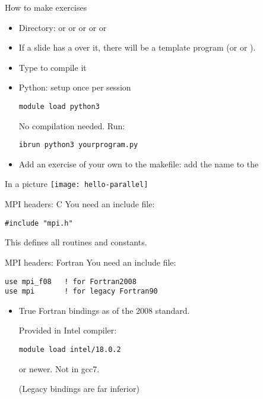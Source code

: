 \begin{numberedframe}{How to make exercises}
  \begin{itemize}
  \item Directory:  or  or  or 
    or  or 
  \item If a slide has a  over it, there will be a
    template program  (or  or ).
  \item Type  to compile it
  \item Python: setup once per session
\begin{verbatim}
module load python3
\end{verbatim}
No compilation needed. Run:
\begin{verbatim}
ibrun python3 yourprogram.py
\end{verbatim}
\item Add an exercise of your own to the makefile: add the name to
    the 
  \end{itemize}
\end{numberedframe}

\begin{exerciseframe}[hello]
  
\end{exerciseframe}

\begin{numberedframe}{In a picture}
  \texttt{[image: hello-parallel]}
\end{numberedframe}


\begin{numberedframe}{MPI headers: C}
\label{sl:mpi-header-c}
You need an include file:
\begin{verbatim}
#include "mpi.h"
\end{verbatim}
This defines all routines and constants.
\end{numberedframe}

\begin{fortran}
\begin{numberedframe}{MPI headers: Fortran}
\label{sl:mpi-header-f}
You need an include file:
\begin{verbatim}
use mpi_f08   ! for Fortran2008
use mpi       ! for legacy Fortran90
\end{verbatim}
\begin{itemize}
\item True Fortran bindings as of the 2008 standard.
\begin{tacc}
Provided in Intel compiler:
\begin{verbatim}
module load intel/18.0.2
\end{verbatim}
or newer. Not in gcc7.
\end{tacc}
(Legacy bindings are far inferior)
\end{itemize}
\end{numberedframe}
\end{fortran}

